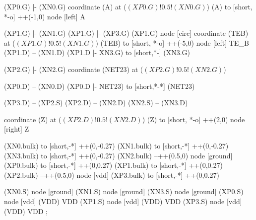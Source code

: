 \begin{circuitikz}[american]
	
	(XP0.G)	|- (XN0.G)
	coordinate (A) at ($(XP0.G)!0.5!(XN0.G)$)
	(A) to [short, *-o] ++(-1,0) node [left] {A}
	
	(XP1.G) |- (XN1.G)
	(XP1.G) |- (XP3.G)
	(XP1.G) node [circ]{}
	coordinate (TEB) at ($(XP1.G)!0.5!(XN1.G)$)
	(TEB) to [short, *-o] ++(-5,0) node [left] {TE\_B}
	(XP1.D) -- (XN1.D)
	(XP1.D |- XN3.G) to [short,*-] (XN3.G)
	
	(XP2.G) |- (XN2.G)
	coordinate (NET23) at ($(XP2.G)!0.5!(XN2.G)$)
	
	(XP0.D) -- (XN0.D)
	(XP0.D |- NET23) to [short,*-*] (NET23)
	
	(XP3.D) -- (XP2.S)
	(XP2.D) -- (XN2.D)
	(XN2.S) -- (XN3.D)
	
	coordinate (Z) at ($(XP2.D)!0.5!(XN2.D)$)
	(Z) to [short, *-o] ++(2,0) node [right] {Z}
	
	(XN0.bulk) to [short,-*] ++(0,-0.27)	
	(XN1.bulk) to [short,-*] ++(0,-0.27)
	(XN3.bulk) to [short,-*] ++(0,-0.27)
	(XN2.bulk) --++(0.5,0) node [ground]{}	
	(XP0.bulk) to [short,-*] ++(0,0.27)	
	(XP1.bulk) to [short,-*] ++(0,0.27)		
	(XP2.bulk) --++(0.5,0) node [vdd]{}
	(XP3.bulk) to [short,-*] ++(0,0.27)	


	(XN0.S) node [ground] {}
	(XN1.S) node [ground] {}
	(XN3.S) node [ground] {}
	(XP0.S) node [vdd] (VDD) {VDD}
	(XP1.S) node [vdd] (VDD) {VDD}
	(XP3.S) node [vdd] (VDD) {VDD}
;

\end{circuitikz}
